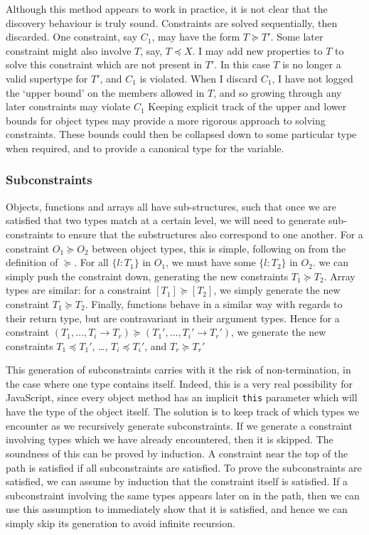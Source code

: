 \documentclass[12pt,a4paper,twoside,openright]{report}
\theoremstyle{definition}
\theoremstyle{dotless}
\newcommand*{\js}{\texttt}
\begin{document}
Although this method appears to work in practice, it is not clear that the
discovery behaviour is truly sound. Constraints are solved sequentially, then
discarded. One constraint, say $C_1$, may have the form $T\succeq T'$. Some
later constraint might also involve $T$, say, $T\preceq X$.  I may add new
properties to $T$ to solve this constraint which are not present in $T'$. In
this case $T$ is no longer a valid supertype for $T'$, and $C_1$ is violated.
When I discard $C_1$, I have not logged the `upper bound' on the members
allowed in $T$, and so growing through any later constraints may violate $C_1$
Keeping explicit track of the upper and lower bounds for object types may
provide a more rigorous approach to solving constraints. These bounds could
then be collapsed down to some particular type when required, and to provide a
canonical type for the variable.

\subsubsection*{Subconstraints}
Objects, functions and arrays all have sub-structures, such that once we are
satisfied that two types match at a certain level, we will need to generate
sub-constraints to ensure that the substructures also correspond to one
another. For a constraint $O_1\succeq O_2$ between object types, this is
simple, following on from the definition of $\succeq$. For all $\{l:T_1\}$ in
$O_1$, we must have some $\{l:T_2\}$ in $O_2$. we can simply push the
constraint down, generating the new constraints $T_1\succeq T_2$. Array types
are similar: for a constraint $[T_1]\succeq[T_2]$, we simply generate the new
constraint $T_1\succeq T_2$. Finally, functions behave in a similar way with
regards to their return type, but are contravariant in their argument types.
Hence for a constraint $(T_1, \ldots, T_i \rightarrow T_r) \succeq(T_1',
\ldots, T_i' \rightarrow T_r')$, we generate the new constraints $T_1\preceq
T_1'$, \dots, $T_i\preceq T_i'$, and $T_r \succeq T_r'$

This generation of subconstraints carries with it the risk of non-termination,
in the case where one type contains itself. Indeed, this is a very real
possibility for JavaScript, since every object method has an implicit \js{this}
parameter which will have the type of the object itself. The solution is to
keep track of which types we encounter as we recursively generate
subconstraints. If we generate a constraint involving types which we have
already encountered, then it is skipped. The soundness of this can be proved by
induction. A constraint near the top of the path is satisfied if all
subconstraints are satisfied. To prove the subconstraints are satisfied, we can
assume by induction that the constraint itself is satisfied. If a subconstraint
involving the same types appears later on in the path, then we can use this
assumption to immediately show that it is satisfied, and hence we can simply
skip its generation to avoid infinite recursion.
\end{document}
